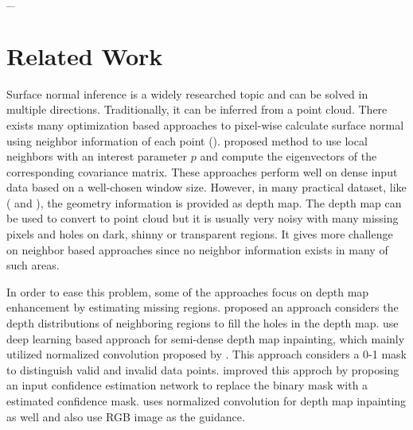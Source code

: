 _{}%

\chapter{Related Work} %

\label{ch:02} %

Surface normal inference is a widely researched topic and can be solved in multiple directions. Traditionally, it can be inferred from a point cloud. There exists many optimization based approaches to pixel-wise calculate surface normal using neighbor information of each point (\cite{optimized-methods}). \cite{Holzer.S} proposed method to use local neighbors with an interest parameter $ p $ and compute the eigenvectors of the corresponding covariance matrix.  These approaches perform well on dense input data based on a well-chosen window size. However, in many practical dataset, like  (\cite{nyu} and \cite{kitti-depth}), the geometry information is provided as depth map. The depth map can be used to convert to point cloud but it is usually very noisy with many missing pixels and holes on dark, shinny or transparent regions. It gives more challenge on neighbor based approaches since no neighbor information exists in many of such areas. 

In order to ease this problem, some of the approaches focus on depth map enhancement by estimating missing regions.  \cite{depth-inpainting-distribution} proposed an approach considers the depth distributions of neighboring regions to fill the holes in the depth map. \cite{ncnn} use deep learning based approach for semi-dense depth map inpainting, which mainly utilized normalized convolution proposed by \cite{nconv}. This approach considers a 0-1 mask to distinguish valid and invalid data points. \cite{pncnn} improved this approch by proposing an input confidence estimation network to replace the binary mask with a estimated confidence mask. \cite{depth-enhance-guided} uses normalized convolution for depth map inpainting as well and also use RGB image as the guidance. 

